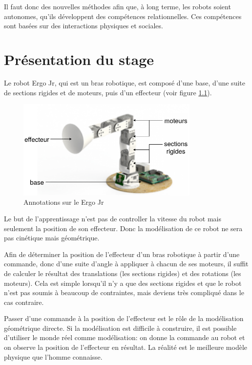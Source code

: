 \documentclass[11pt,french]{report}
\begin{document}
Il faut donc des nouvelles méthodes afin que, à long terme, les robots soient autonomes, qu'ils développent des compétences relationnelles.
Ces compétences sont basées sur des interactions physiques et sociales.

\chapter{Présentation du stage}

Le robot Ergo Jr, qui est un bras robotique, est composé d'une base, d'une suite de sections rigides et de moteurs, puis d'un effecteur (voir figure \ref{fig:SchemaErgoJr}).

\phantom{INVISIBLE LINE}

\begin{figure}[H]
    \centering
    \includegraphics[height=140pt]{Ergo_Diagram} 
    \caption{Annotations sur le Ergo Jr}
    \label{fig:SchemaErgoJr}
\end{figure}

Le but de l'apprentissage n'est pas de controller la vitesse du robot mais seulement la position de son effecteur.
Donc la modélisation de ce robot ne sera pas cinétique mais géométrique.

\phantom{INVISIBLE LINE}

Afin de déterminer la position de l'effecteur d'un bras robotique à partir d'une commande, donc d'une suite d'angle à appliquer à chacun de ses moteurs, il suffit de calculer le résultat des translations (les sections rigides) et des rotations (les moteurs).
Cela est simple lorsqu'il n'y a que des sections rigides et que le robot n'est pas soumis à beaucoup de contraintes, mais deviens très compliqué dans le cas contraire.

Passer d'une commande à la position de l'effecteur est le rôle de la modélisation géométrique directe.
Si la modélisation est difficile à construire, il est possible d'utiliser le monde réel comme modélisation: on donne la commande au robot et on observe la position de l'effecteur en résultat.
La réalité est le meilleure modèle physique que l'homme connaisse.
\end{document}
